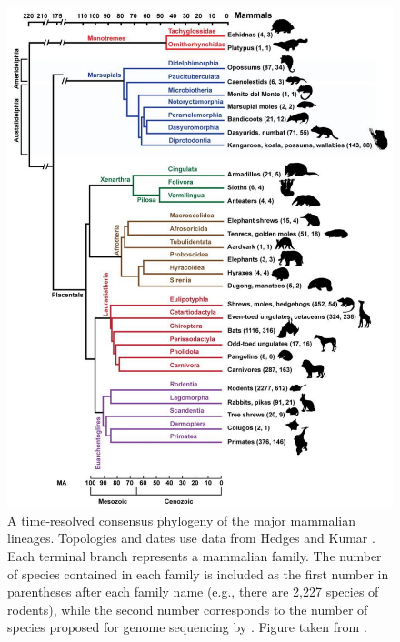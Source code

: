 \begin{figure}
\centering
\includegraphics[scale=0.5]{Figs/mammals_10k.pdf}
\caption{A time-resolved consensus phylogeny of the major mammalian
  lineages. Topologies and dates use data from Hedges and Kumar
  \citeyearpar{Hedges2009}. Each terminal branch represents a
  mammalian family. The number of species contained in each family is
  included as the first number in parentheses after each family name
  (e.g., there are 2,227 species of rodents), while the second number
  corresponds to the number of species proposed for genome sequencing
  by \citet{Haussler2009}. Figure taken from \citet{Haussler2009}.}
\label{fig_mammals_10k}
\end{figure}

